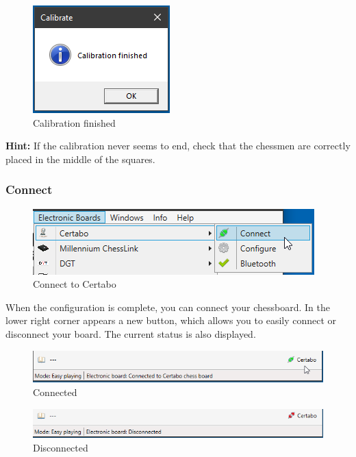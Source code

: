 \documentclass[11pt,a4paper]{article}
\begin{document}
\begin{figure}[H]
	\centering
	\includegraphics[scale=1.0]{Calibrate4.png}
	\caption{Calibration finished }
	\label{fig:Calibrate4}
\end{figure}

\textbf{Hint:} If the calibration never seems to end, check that the chessmen are correctly placed in the middle of the squares.

\subsubsection{Connect}
\begin{figure}[H]
	\centering
	\includegraphics[scale=1.0]{Certabo3.png}
	\caption{Connect to Certabo}
	\label{fig:Certabo3}
\end{figure}
When the configuration is complete, you can connect your chessboard.
In the lower right corner appears a new button, which allows you to easily connect or disconnect your board. The current status is also displayed.

\begin{figure}[H]
	\centering
	\includegraphics[scale=0.8]{Certabo4.png}
	\caption{Connected}
	\label{fig:Certabo4}
\end{figure}

\begin{figure}[H]
	\centering
	\includegraphics[scale=0.8]{Certabo5.png}
	\caption{Disconnected}
	\label{fig:Certabo5}
\end{figure}
\end{document}

